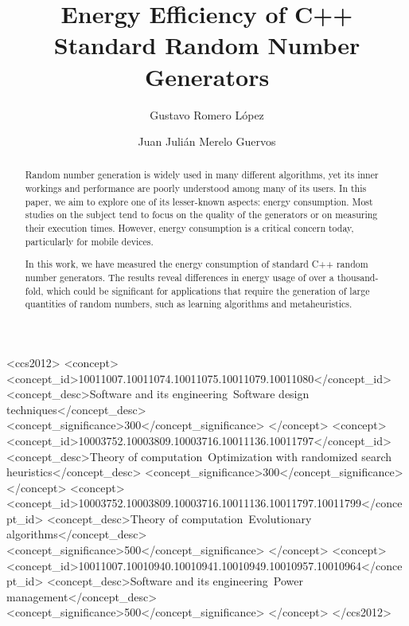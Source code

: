 \documentclass[dvipsnames,format=sigconf,anonymous=true,review=true]{acmart}
\begin{document}
\title{Energy Efficiency of C++ Standard Random Number Generators}

\author{Gustavo Romero López}

\author{Juan Julián Merelo Guervos}

\begin{abstract}
  Random number generation is widely used in many different algorithms, yet its inner workings and performance are poorly understood among many of its users. In this paper, we aim to explore one of its lesser-known aspects: energy consumption. Most studies on the subject tend to focus on the quality of the generators or on measuring their execution times. However, energy consumption is a critical concern today, particularly for mobile devices.
  
  In this work, we have measured the energy consumption of standard C++ random number generators. The results reveal differences in energy usage of over a thousand-fold, which could be significant for applications that require the generation of large quantities of random numbers, such as learning algorithms and metaheuristics.
\end{abstract}

%
%
\begin{CCSXML}
<ccs2012>
   <concept>
       <concept_id>10011007.10011074.10011075.10011079.10011080</concept_id>
       <concept_desc>Software and its engineering~Software design techniques</concept_desc>
       <concept_significance>300</concept_significance>
       </concept>
   <concept>
       <concept_id>10003752.10003809.10003716.10011136.10011797</concept_id>
       <concept_desc>Theory of computation~Optimization with randomized search heuristics</concept_desc>
       <concept_significance>300</concept_significance>
       </concept>
   <concept>
       <concept_id>10003752.10003809.10003716.10011136.10011797.10011799</concept_id>
       <concept_desc>Theory of computation~Evolutionary algorithms</concept_desc>
       <concept_significance>500</concept_significance>
       </concept>
   <concept>
       <concept_id>10011007.10010940.10010941.10010949.10010957.10010964</concept_id>
       <concept_desc>Software and its engineering~Power management</concept_desc>
       <concept_significance>500</concept_significance>
       </concept>
 </ccs2012>
\end{CCSXML}
\end{document}
